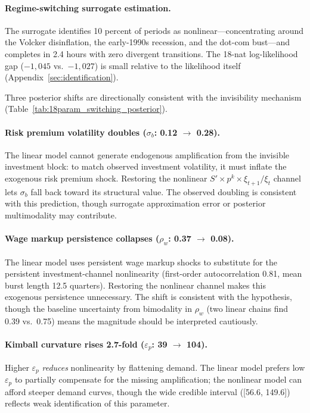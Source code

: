 \documentclass[12pt]{article}
\theoremstyle{plain}
\theoremstyle{definition}
\theoremstyle{remark}
\begin{document}
\paragraph{Regime-switching surrogate estimation.}
\label{par:results_18param_switching}

The surrogate identifies 10 percent of periods as nonlinear---concentrating around the Volcker disinflation, the early-1990s recession, and the dot-com bust---and completes in 2.4 hours with zero divergent transitions. The 18-nat log-likelihood gap ($-1{,}045$ vs.\ $-1{,}027$) is small relative to the likelihood itself (Appendix~\ref{sec:identification}).

Three posterior shifts are directionally consistent with the invisibility mechanism (Table~\ref{tab:18param_switching_posterior}).

\paragraph{Risk premium volatility doubles ($\sigma_b$: 0.12 $\to$ 0.28).} The linear model cannot generate endogenous amplification from the invisible investment block: to match observed investment volatility, it must inflate the exogenous risk premium shock. Restoring the nonlinear $S' \times p^k \times \xi_{t+1}/\xi_t$ channel lets $\sigma_b$ fall back toward its structural value. The observed doubling is consistent with this prediction, though surrogate approximation error or posterior multimodality may contribute.

\paragraph{Wage markup persistence collapses ($\rho_w$: 0.37 $\to$ 0.08).} The linear model uses persistent wage markup shocks to substitute for the persistent investment-channel nonlinearity (first-order autocorrelation 0.81, mean burst length 12.5 quarters). Restoring the nonlinear channel makes this exogenous persistence unnecessary. The shift is consistent with the hypothesis, though the baseline uncertainty from bimodality in $\rho_w$ (two linear chains find 0.39 vs.\ 0.75) means the magnitude should be interpreted cautiously.

\paragraph{Kimball curvature rises 2.7-fold ($\varepsilon_p$: 39 $\to$ 104).} Higher $\varepsilon_p$ \emph{reduces} nonlinearity by flattening demand. The linear model prefers low $\varepsilon_p$ to partially compensate for the missing amplification; the nonlinear model can afford steeper demand curves, though the wide credible interval ([56.6, 149.6]) reflects weak identification of this parameter.
\end{document}
